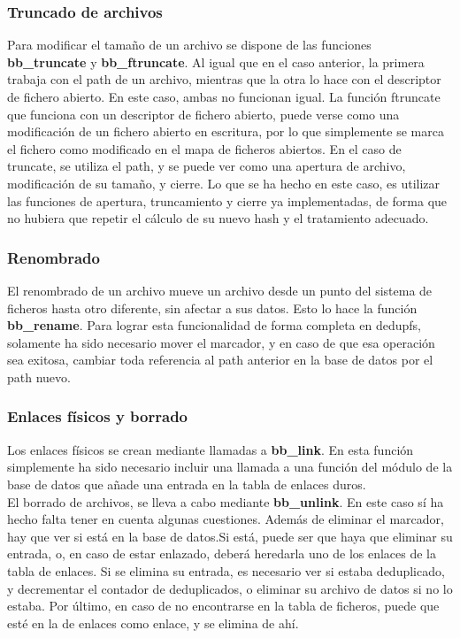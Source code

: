 \documentclass[12pt,a4paper]{article}
\begin{document}
\subsubsection{Truncado de archivos}

Para modificar el tamaño de un archivo se dispone de las funciones \textbf{bb\_truncate} y \textbf{bb\_ftruncate}. Al igual que en el caso anterior, la primera trabaja con el path de un archivo, mientras que la otra lo hace con el descriptor de fichero abierto. En este caso, ambas no funcionan igual. La función ftruncate que funciona con un descriptor de fichero abierto, puede verse como una modificación de un fichero abierto en escritura, por lo que simplemente se marca el fichero como modificado en el mapa de ficheros abiertos. En el caso de truncate, se utiliza el path, y se puede ver como una apertura de archivo, modificación de su tamaño, y cierre. Lo que se ha hecho en este caso, es utilizar las funciones de apertura, truncamiento y cierre ya implementadas, de forma que no hubiera que repetir el cálculo de su nuevo hash y el tratamiento adecuado.

\subsubsection{Renombrado}

El renombrado de un archivo mueve un archivo desde un punto del sistema de ficheros hasta otro diferente, sin afectar a sus datos. Esto lo hace la función \textbf{bb\_rename}. Para lograr esta funcionalidad de forma completa en dedupfs, solamente ha sido necesario mover el marcador, y en caso de que esa operación sea exitosa, cambiar toda referencia al path anterior en la base de datos por el path nuevo.

\subsubsection{Enlaces físicos y borrado}

Los enlaces físicos se crean mediante llamadas a \textbf{bb\_link}. En esta función simplemente ha sido necesario incluir una llamada a una función del módulo de la base de datos que añade una entrada en la tabla de enlaces duros.\\
El borrado de archivos, se lleva a cabo mediante \textbf{bb\_unlink}. En este caso sí ha hecho falta tener en cuenta algunas cuestiones. Además de eliminar el marcador, hay que ver si está en la base de datos.Si está, puede ser que haya que eliminar su entrada, o, en caso de estar enlazado, deberá heredarla uno de los enlaces de la tabla de enlaces. Si se elimina su entrada, es necesario ver si estaba deduplicado, y decrementar el contador de deduplicados, o eliminar su archivo de datos si no lo estaba. Por último, en caso de no encontrarse en la tabla de ficheros, puede que esté en la de enlaces como enlace, y se elimina de ahí.
\end{document}
